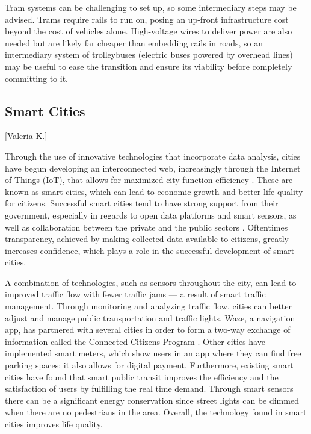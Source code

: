\documentclass[12pt]{article}                         %
\begin{document}
Tram systems can be challenging to set up, so some intermediary steps may be advised. Trams require rails to run on, posing an up-front infrastructure cost beyond the cost of vehicles alone. High-voltage wires to deliver power are also needed but are likely far cheaper than embedding rails in roads, so an intermediary system of trolleybuses (electric buses powered by overhead lines) may be useful to ease the transition and ensure its viability before completely committing to it. 

\subsection{Smart Cities}[Valeria K.]

Through the use of innovative technologies that incorporate data analysis, cities have begun developing an interconnected web, increasingly through the Internet of Things (IoT), that allows for maximized city function efficiency \cite{MargaretRouseSmartCity}. These are known as smart cities, which can lead to economic growth and better life quality for citizens. Successful smart cities tend to have strong support from their government, especially in regards to open data platforms and smart sensors, as well as collaboration between the private and the public sectors \cite{BrianZanghi2017WhyExamples}. Oftentimes transparency, achieved by making collected data available to citizens, greatly increases confidence, which plays a role in the successful development of smart cities.

A combination of technologies, such as sensors throughout the city, can lead to improved traffic flow with fewer traffic jams --- a result of smart traffic management. Through monitoring and analyzing traffic flow, cities can better adjust and manage public transportation and traffic lights. Waze, a navigation app, has partnered with several cities in order to form a two-way exchange of information called the Connected Citizens Program \cite{Stern2016WazeMobility}. Other cities have implemented smart meters, which show users in an app where they can find free parking spaces; it also allows for digital payment. Furthermore, existing smart cities have found that smart public transit improves the efficiency and the satisfaction of users by fulfilling the real time demand. Through smart sensors there can be a significant energy conservation since street lights can be dimmed when there are no pedestrians in the area. Overall, the technology found in smart cities improves life quality.
\end{document}
